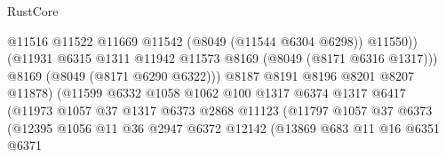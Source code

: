 \begin{lexlean}{RustCore}
\begin{coremodule}
                                            @11516
                                            @11522
                                            @11669
                                            @11542
                                            (@8049 (@11544 @6304 @6298))
                                            @11550))
                                        (@11931
                                          @6315
                                          @1311
                                          @11942
                                          @11573
                                          @8169
                                          (@8049 (@8171 @6316 @1317)))
                                        @8169
                                        (@8049 (@8171 @6290 @6322)))
                                      @8187
                                      @8191
                                      @8196
                                      @8201
                                      @8207
                                      @11878)
                                    (@11599
                                      @6332
                                      @1058
                                      @1062
                                      @100
                                      @1317
                                      @6374
                                      @1317
                                      @6417
                                      (@11973
                                        @1057
                                        @37
                                        @1317
                                        @6373
                                        @2868
                                        @11123
                                        (@11797
                                          @1057
                                          @37
                                          @6373
                                          (@12395
                                            @1056
                                            @11
                                            @36
                                            @2947
                                            @6372
                                            @12142
                                            (@13869
                                              @683
                                              @11
                                              @16
                                              @6351
                                              @6371

\end{coremodule}
\end{lexlean}
